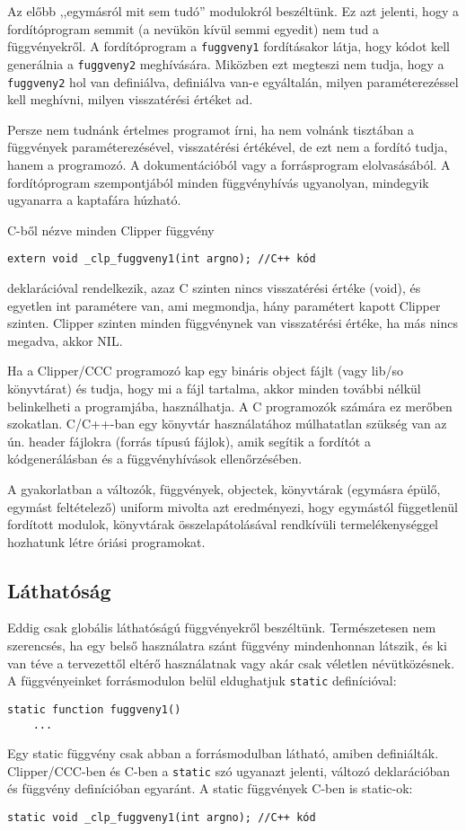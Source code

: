 Az előbb ,,egymásról mit sem tudó'' modulokról beszéltünk.
Ez azt jelenti, hogy a fordítóprogram semmit (a nevükön kívül semmi egyedit)
nem tud a függvényekről. A fordítóprogram a \verb!fuggveny1! fordításakor
látja, hogy kódot kell generálnia a \verb!fuggveny2! meghívására. Miközben
ezt megteszi nem tudja, hogy a \verb!fuggveny2! hol van definiálva,
definiálva van-e egyáltalán, milyen paraméterezéssel kell meghívni,
milyen visszatérési értéket ad.

Persze nem tudnánk értelmes programot írni, 
ha nem volnánk tisztában a függvények paraméterezésével, 
visszatérési értékével, de ezt nem a fordító tudja, hanem a programozó. 
A dokumentációból vagy a forrásprogram  elolvasásából. 
A fordítóprogram szempontjából minden függvényhívás ugyanolyan,
mindegyik ugyanarra a kaptafára húzható.

C-ből nézve minden Clipper függvény 
\begin{verbatim}
extern void _clp_fuggveny1(int argno); //C++ kód
\end{verbatim}
deklarációval rendelkezik, azaz C szinten nincs visszatérési értéke (void), 
és egyetlen int paramétere van, ami megmondja,  hány paramétert 
kapott Clipper szinten. Clipper szinten minden függvénynek van visszatérési
értéke, ha más nincs megadva, akkor NIL. 

Ha a Clipper/CCC programozó kap egy bináris object fájlt 
(vagy lib/so könyvtárat) és tudja, hogy mi a fájl tartalma, 
akkor minden további nélkül belinkelheti a programjába, használhatja.
A C programozók számára ez merőben szokatlan. 
C/C++-ban egy könyvtár használatához múlhatatlan szükség van az ún. header 
fájlokra (forrás típusú fájlok), amik segítik a fordítót a kódgenerálásban és 
a függvényhívások ellenőrzésében.


A gyakorlatban a változók, függvények, objectek, könyvtárak
(egymásra épülő, egymást feltételező) uniform mivolta azt eredményezi, 
hogy egymástól függetlenül fordított modulok, könyvtárak összelapátolásával 
rendkívüli termelékenységgel hozhatunk létre óriási programokat.



\subsection{Láthatóság}

Eddig csak globális láthatóságú függvényekről beszéltünk.
Természetesen nem szerencsés, ha egy belső használatra szánt
függvény mindenhonnan látszik, és ki van téve a tervezettől eltérő használatnak
vagy akár csak véletlen névütközésnek.
A függvényeinket forrásmodulon belül eldughatjuk \verb!static! definícióval:
\begin{verbatim}
static function fuggveny1()
    ...
\end{verbatim}
Egy static függvény csak abban a forrásmodulban látható, amiben definiálták. 
Clipper/CCC-ben és C-ben a \verb!static! szó ugyanazt jelenti,
változó deklarációban és függvény definícióban egyaránt.
A static függvények C-ben is static-ok:
\begin{verbatim}
static void _clp_fuggveny1(int argno); //C++ kód
\end{verbatim}


